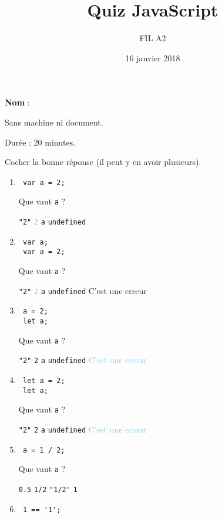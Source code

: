 \documentclass[a4paper, 12pt]{article}
\title{Quiz JavaScript}
\author{FIL A2}
\date{16 janvier 2018}
\newcommand{\choice}[1]{\Square\hspace{2pt} #1\hspace{5pt}}
\newcommand{\choicec}[1]{\Square\hspace{2pt} \lstinline{#1}\hspace{5pt}}
\newcommand{\fullpoint}[1]{\textcolor{RubineRed}{#1}}
\newcommand{\halfpoint}[1]{\textcolor{SkyBlue}{#1}}
\newcommand{\choicegh}[1]{\halfpoint{\XBox\hspace{2pt} #1\hspace{5pt}}}
\newcommand{\choicecg}[1]{\fullpoint{\XBox\hspace{2pt} \lstinline{#1}\hspace{5pt}}}
\newcommand{\choicecgh}[1]{\halfpoint{\XBox\hspace{2pt} \lstinline{#1}\hspace{5pt}}}
\begin{document}
\maketitle

\textbf{Nom} :

Sans machine ni document.

Durée : 20 minutes.

Cocher la bonne réponse (il peut y en avoir plusieurs).

\begin{enumerate}
\item \lstset{language=javascript}
\begin{lstlisting}
 var a = 2;
\end{lstlisting}

  Que vaut \lstinline{a} ?

  \choicec{"2"} \choicecgh{2} \choicec{a} \choicec{undefined}
\item \lstset{language=javascript}
\begin{lstlisting}
 var a;
 var a = 2;
\end{lstlisting}

  Que vaut \lstinline{a} ?

  \choicec{"2"} \choicecgh{2} \choicec{a} \choicec{undefined} \choice{C'est une erreur}
\item \lstset{language=javascript}
\begin{lstlisting}
 a = 2;
 let a;
\end{lstlisting}

  Que vaut \lstinline{a} ?

  \choicec{"2"} \choicec{2} \choicec{a} \choicec{undefined} \choicegh{C'est une erreur}
\item \lstset{language=javascript}
\begin{lstlisting}
 let a = 2;
 let a;
\end{lstlisting}

  Que vaut \lstinline{a} ?

  \choicec{"2"} \choicec{2} \choicec{a} \choicec{undefined} \choicegh{C'est une erreur}
\item \lstset{language=javascript}
\begin{lstlisting}
 a = 1 / 2;
\end{lstlisting}

  Que vaut \lstinline{a} ?

  \choicecg{0.5} \choicec{1/2} \choicec{"1/2"} \choicec{1}
\item \lstset{language=javascript}
\begin{lstlisting}
 1 == '1';
\end{lstlisting}


\end{enumerate}
\end{document}
